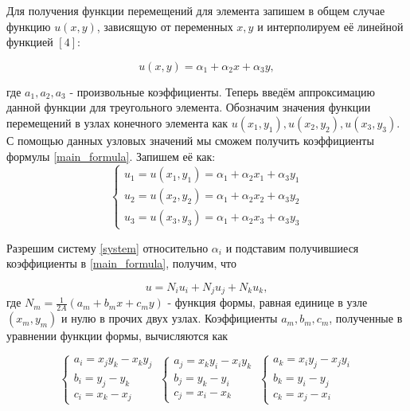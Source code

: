 \documentclass[a4paper]{article}
\begin{document}
\newpage

Для получения функции перемещений для элемента запишем в общем случае функцию $u(x, y)$, зависящую от переменных $x, y$ и интерполируем её линейной функцией $\left[4\right]$:

\begin{equation}\label{main_formula}
u(x, y) = \alpha_1 + \alpha_2 x + \alpha_3 y,
\end{equation} 

где $a_1, a_2, a_3$ - произвольные коэффициенты. Теперь введём аппроксимацию данной функции для треугольного элемента. Обозначим значения функции перемещений в узлах конечного элемента как $u(x_1, y_1), u(x_2, y_2), u(x_3, y_3)$. С помощью данных узловых значений мы сможем получить коэффициенты формулы \ref{main_formula}. Запишем её как:
\begin{equation}\label{system}
\left\{\begin{matrix}
u_1 = u(x_1, y_1) = \alpha_1 + \alpha_2 x_1 + \alpha_3 y_1\\
u_2 = u(x_2, y_2) = \alpha_1 + \alpha_2 x_2 + \alpha_3 y_2 \\
u_3 = u(x_3, y_3) = \alpha_1 + \alpha_2 x_3 + \alpha_3 y_3 
\end{matrix}\right.
\end{equation}

Разрешим систему \ref{system} относительно $\alpha_i$ и подставим получившиеся коэффициенты в \ref{main_formula}, получим, что

\begin{equation*}
u = N_i u_i + N_j u_j + N_k u_k,
\end{equation*}
где $N_m = \frac{1}{2A}(a_m + b_m x + c_m y)$ - функция формы, равная единице в узле $(x_m, y_m)$ и нулю в прочих двух узлах. Коэффициенты $a_m, b_m, c_m$, полученные в уравнении функции формы, вычисляются как

\begin{equation*}
\left\{\begin{matrix}
a_i = x_j y_k - x_k y_j \\
b_i = y_j - y_k \\
c_i = x_k - x_j
\end{matrix}\right.
\
\left\{\begin{matrix}
a_j = x_k y_i - x_i y_k \\
b_j = y_k - y_i \\
c_j = x_i - x_k
\end{matrix}\right.
\
\left\{\begin{matrix}
a_k = x_i y_j - x_j y_i \\
b_k = y_i - y_j \\
c_k = x_j - x_i
\end{matrix}\right.
\end{equation*}
\end{document}
